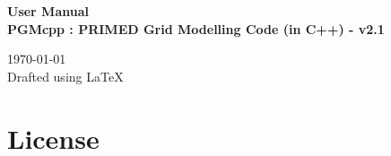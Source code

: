 \documentclass[12pt, letterpaper]{report}
\begin{document}

\begin{titlepage}
	\begin{center}
		\Large \textbf{User Manual} \\
        \large \textbf{PGMcpp : PRIMED Grid Modelling Code (in C++) - v2.1} \\
	\end{center}
	\vfill
	\begin{center}
		\today \\
		\vspace{3mm}
		Drafted using \LaTeX
	\end{center}	   
\end{titlepage}




\chapter*{License}
\end{document}
